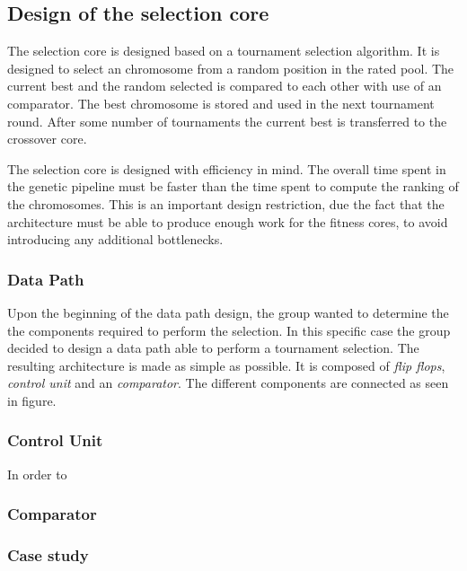 \subsection {Design of the selection core} \label{fpga:selection:ss:selection_core}


The selection core is designed based on a tournament selection algorithm. It is designed to select an chromosome from a random position in the rated pool. The current best and the random selected is compared to each other with use of an comparator. The best chromosome is stored and used in the next tournament round. After some number of tournaments the current best is transferred to the crossover core. 


The selection core is designed with efficiency in mind.
The overall time spent in the genetic pipeline must be faster than the time spent to compute the ranking of the chromosomes. This is an important design restriction, due the fact that the architecture must be able to produce enough work for the fitness cores, to avoid introducing any additional bottlenecks.


\subsubsection{Data Path}
Upon the beginning of the data path design, the group wanted to determine the the components required to perform the selection. In this specific case the group decided to design a data path able to perform a tournament selection. The resulting architecture is made as simple as possible.  It is composed of \emph{flip flops}, \emph{control unit} and an \emph{comparator}. The different components are connected as seen in figure.



\subsubsection{Control Unit} \label{fpga:selection:sss:control_unit}
In order to 


\subsubsection {Comparator} \label{fpga:selection:sss:comparator}



\subsubsection{Case study} \label{fpga:selection:sss:case_study}




